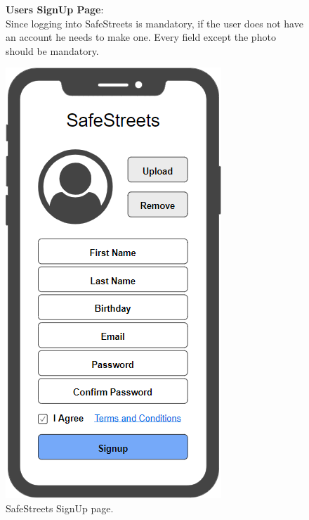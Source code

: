 \begin{figure}
	\begin{flushleft}
		\textbf{Users SignUp Page}:\\
		Since logging into SafeStreets is mandatory, if the user does not have an account he needs to make one. Every field except the photo should be mandatory.
	\end{flushleft}
	\centering
	\includegraphics[width=0.6\linewidth]{../RASD/images/mockups/signup}
	\caption{SafeStreets SignUp page.}
	\label{fig:signup}
\end{figure}
\clearpage
